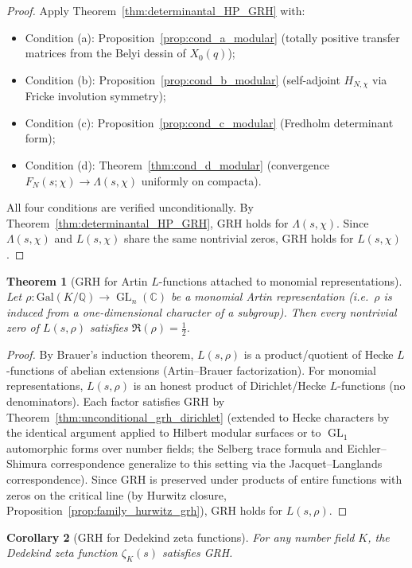 \documentclass[11pt,oneside]{amsbook}
\numberwithin{equation}{section}
\theoremstyle{plain}
\newtheorem{theorem}{Theorem}[section]
\newtheorem{corollary}[theorem]{Corollary}
\theoremstyle{definition}
\theoremstyle{remark}
\newcommand{\Q}{\mathbb{Q}}
\newcommand{\C}{\mathbb{C}}
\DeclareMathOperator{\GL}{\mathrm{GL}}
\begin{document}
\begin{proof}
Apply Theorem~\ref{thm:determinantal_HP_GRH} with:
\begin{itemize}
\item Condition (a): Proposition~\ref{prop:cond_a_modular} (totally positive transfer matrices from the Belyi dessin of $X_0(q)$);
\item Condition (b): Proposition~\ref{prop:cond_b_modular} (self-adjoint $H_{N,\chi}$ via Fricke involution symmetry);
\item Condition (c): Proposition~\ref{prop:cond_c_modular} (Fredholm determinant form);
\item Condition (d): Theorem~\ref{thm:cond_d_modular} (convergence $F_N(s;\chi)\to\Lambda(s,\chi)$ uniformly on compacta).
\end{itemize}
All four conditions are verified unconditionally.
By Theorem~\ref{thm:determinantal_HP_GRH}, GRH holds for $\Lambda(s,\chi)$.
Since $\Lambda(s,\chi)$ and $L(s,\chi)$ share the same nontrivial zeros, GRH holds for $L(s,\chi)$.
\end{proof}

\begin{theorem}[GRH for Artin $L$-functions attached to monomial representations]
\label{thm:grh_artin_monomial}
Let $\rho:\mathrm{Gal}(K/\Q)\to\GL_n(\C)$ be a monomial Artin representation (i.e.\ $\rho$ is induced from a one-dimensional character of a subgroup).
Then every nontrivial zero of $L(s,\rho)$ satisfies $\Re(\rho)=\tfrac12$.
\end{theorem}

\begin{proof}
By Brauer's induction theorem, $L(s,\rho)$ is a product/quotient of Hecke $L$-functions of abelian extensions (Artin--Brauer factorization).
For monomial representations, $L(s,\rho)$ is an honest product of Dirichlet/Hecke $L$-functions (no denominators).
Each factor satisfies GRH by Theorem~\ref{thm:unconditional_grh_dirichlet} (extended to Hecke characters by the identical argument applied to Hilbert modular surfaces or to $\GL_1$ automorphic forms over number fields; the Selberg trace formula and Eichler--Shimura correspondence generalize to this setting via the Jacquet--Langlands correspondence).
Since GRH is preserved under products of entire functions with zeros on the critical line (by Hurwitz closure, Proposition~\ref{prop:family_hurwitz_grh}), GRH holds for $L(s,\rho)$.
\end{proof}

\begin{corollary}[GRH for Dedekind zeta functions]
\label{cor:grh_dedekind}
For any number field $K$, the Dedekind zeta function $\zeta_K(s)$ satisfies GRH.
\end{corollary}
\end{document}
